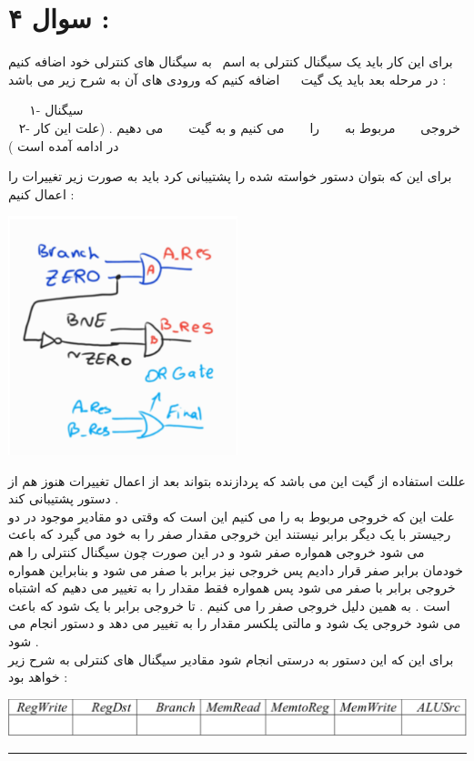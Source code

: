 \section*{سوال ۴ : }
برای این کار باید یک سیگنال کنترلی به اسم 
\lr{\textcolor{red}{BNE}}
 به سیگنال های کنترلی خود اضافه کنیم در مرحله بعد باید یک گیت 
 اضافه کنیم که ورودی های آن به شرح زیر می باشد  : 
 \begin{flushright}
 		
 	۱- سیگنال 
 	\\
 	۲- خروجی 
 	مربوط به 
 	را 
 	می کنیم و به گیت 
 	می دهیم . (علت این کار در ادامه آمده است )
 \end{flushright}
برای این که بتوان دستور خواسته شده را پشتیبانی کرد باید به صورت زیر تغییرات را اعمال کنیم  : 
\begin{center}
	\includegraphics[width = 0.5\textwidth]{bne}
\end{center}
عللت استفاده از گیت 
این می باشد که پردازنده بتواند بعد از اعمال تغییرات هنوز هم از دستور 
پشتیبانی کند . 
\\
علت این که خروجی 
مربوط به 
را 
می کنیم این است که وقتی دو مقادیر موجود در دو رجیستر با یک دیگر برابر نیستند این خروجی مقدار صفر را به خود می گیرد که باعث می شود خروجی 
همواره صفر شود و در این صورت چون سیگنال کنترلی 
را هم خودمان برابر صفر قرار دادیم پس خروجی 
نیز برابر با صفر می شود و بنابراین همواره خروجی 
برابر با صفر می شود پس همواره فقط مقدار 
را به 
تغییر می دهیم که اشتباه است . به همین دلیل خروجی صفر 
را 
می کنیم . تا خروجی 
برابر با یک شود که باعث می شود خروجی 
یک شود و مالتی پلکسر مقدار 
را به 
تغییر می دهد و دستور 
انجام می شود . 
\\ 
برای این که این دستور به درستی انجام شود مقادیر سیگنال های کنترلی به شرح زیر خواهد بود : 
\begin{center}
	\includegraphics[width=1\textwidth]{beq}
\end{center}
\hrule

